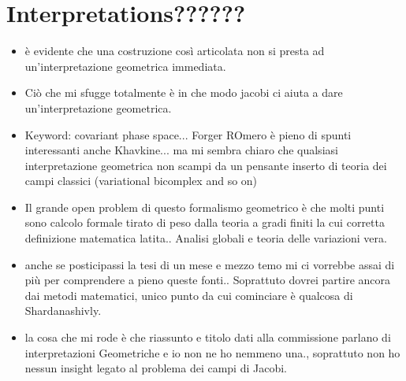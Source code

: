 \documentclass[Main]{subfiles}
\begin{document}
\section{Interpretations??????}
\ifToninus
	\begin{Warning}
		\begin{itemize}
			\item 		è evidente che una costruzione così articolata non si presta ad un'interpretazione geometrica immediata.
			\item 		Ciò che mi sfugge totalmente è in che modo jacobi ci aiuta a dare  un'interpretazione geometrica.
			\item		Keyword: covariant phase space...  Forger ROmero è pieno di spunti interessanti anche Khavkine... ma mi sembra chiaro che qualsiasi interpretazione geometrica non scampi da un pensante inserto di teoria dei campi classici (variational bicomplex and so on)
			\item		Il grande open problem di questo formalismo geometrico è che molti punti sono calcolo formale tirato di peso dalla teoria a gradi finiti la cui corretta definizione matematica latita.. Analisi globali e teoria delle variazioni vera.
			\item anche se posticipassi la tesi di un mese  e mezzo temo mi ci vorrebbe assai di più per comprendere a pieno queste fonti.. Soprattuto dovrei partire ancora dai metodi matematici, unico punto da cui cominciare è qualcosa di Shardanashivly.
			\item la cosa che mi rode è che riassunto e titolo dati alla commissione parlano di interpretazioni Geometriche e io non ne ho nemmeno una., soprattuto non ho nessun insight legato al problema dei campi di Jacobi.
			
		\end{itemize}
		
		

	\end{Warning}
\fi
\end{document}

